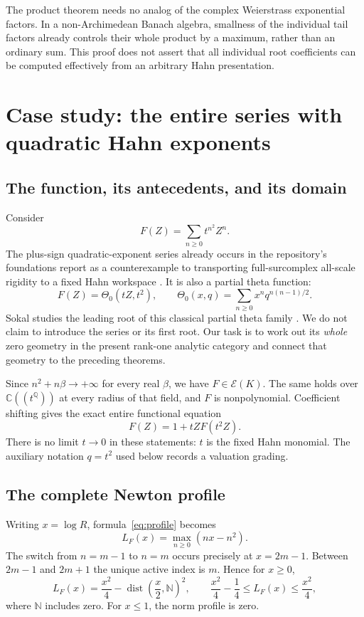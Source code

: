 \documentclass[11pt,a4paper]{article}
\numberwithin{equation}{section}
\theoremstyle{definition}
\theoremstyle{remark}
\newcommand{\C}{\mathbb C}
\newcommand{\Q}{\mathbb Q}
\newcommand{\N}{\mathbb N}
\newcommand{\EE}{\mathcal E}
\begin{document}
The product theorem needs no analog of the complex Weierstrass exponential
factors. In a non-Archimedean Banach algebra, smallness of the individual tail
factors already controls their whole product by a maximum, rather than an
ordinary sum. This proof does not assert that all individual root coefficients
can be computed effectively from an arbitrary Hahn presentation.

\section{Case study: the entire series with quadratic Hahn exponents}
\label{sec:theta}

\subsection{The function, its antecedents, and its domain}
Consider
\begin{equation}\label{eq:theta}
 F(Z)=\sum_{n\ge0}t^{n^2}Z^n.
\end{equation}
The plus-sign quadratic-exponent series already occurs in the repository's
foundations report as a counterexample to transporting full-surcomplex
all-scale rigidity to a fixed Hahn workspace \cite{RepoFoundations}.
It is also a partial theta function:
\[
 F(Z)=\Theta_0(tZ,t^2),\qquad
 \Theta_0(x,q)=\sum_{n\ge0}x^n q^{n(n-1)/2}.
\]
Sokal studies the leading root of this classical partial theta family
\cite{Sokal}. We do not claim to introduce the series or its first root.
Our task is to work out its \emph{whole} zero geometry in the present
rank-one analytic category and connect that geometry to the preceding theorems.

Since $n^2+n\beta\to+\infty$ for every real $\beta$, we have
$F\in\EE(K)$. The same holds over $\C((t^\Q))$ at every radius of that
field, and $F$ is nonpolynomial. Coefficient shifting gives the exact entire
functional equation
\begin{equation}\label{eq:functionalequation}
 F(Z)=1+tZ F(t^2Z).
\end{equation}
There is no limit $t\to0$ in these statements: $t$ is the fixed Hahn monomial.
The auxiliary notation $q=t^2$ used below records a valuation grading.

\subsection{The complete Newton profile}
Writing $x=\log R$, formula~\eqref{eq:profile} becomes
\begin{equation}\label{eq:thetaprof}
 L_F(x)=\max_{n\ge0}(nx-n^2).
\end{equation}
The switch from $n=m-1$ to $n=m$ occurs precisely at $x=2m-1$.
Between $2m-1$ and $2m+1$ the unique active index is $m$. Hence for $x\ge0$,
\begin{equation}\label{eq:thetagrowth}
 L_F(x)=\frac{x^2}{4}
 -\operatorname{dist}\!\left(\frac{x}{2},\N\right)^2,
 \qquad
 \frac{x^2}{4}-\frac14\le L_F(x)\le\frac{x^2}{4},
\end{equation}
where $\N$ includes zero. For $x\le1$, the norm profile is zero.
\end{document}
